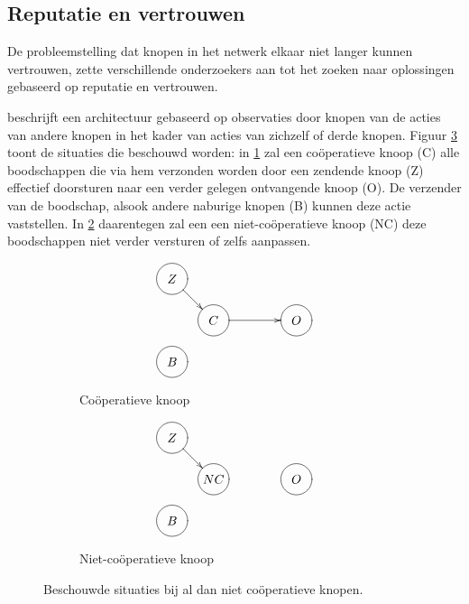 
\subsection{Reputatie en vertrouwen}
\label{subsection:reputation}

De probleemstelling dat knopen in het netwerk elkaar niet langer kunnen
vertrouwen, zette verschillende onderzoekers aan tot het zoeken naar
oplossingen gebaseerd op reputatie en vertrouwen.

\cite{ganeriwal2008reputation} beschrijft een architectuur gebaseerd op
observaties door knopen van de acties van andere knopen in het kader van acties
van zichzelf of derde knopen. Figuur \ref{fig:reputation-cooperation} toont de
situaties die beschouwd worden: in \ref{fig:reputation-cooperative-node} zal
een co\"operatieve knoop (C) alle boodschappen die via hem verzonden worden
door een zendende knoop (Z) effectief doorsturen naar een verder gelegen
ontvangende knoop (O). De verzender van de boodschap, alsook andere naburige
knopen (B) kunnen deze actie vaststellen. In
\ref{fig:reputation-uncooperative-node} daarentegen zal een een
niet-co\"operatieve knoop (NC) deze boodschappen niet verder versturen of zelfs
aanpassen.

\begin{figure}
\centering
\begin{subfigure}{.49\textwidth}
\centering
\[ \entrymodifiers={-=+++[o][F-]}
 \xymatrix@!=0.75pc {
  Z \ar[dr] & *{}       & *{} & *{} \\
  *{}       & C \ar[rr] & *{} & O   \\
  B         & *{}       & *{} & *{} \\
 }
\]
\caption{Co\"operatieve knoop}
\label{fig:reputation-cooperative-node}
\end{subfigure}
\begin{subfigure}{.49\textwidth}
\centering
\[ \entrymodifiers={-=+++[o][F-]}
 \xymatrix@!=0.75pc {
  Z \ar[dr] & *{}       & *{} & *{} \\
  *{}       & NC        & *{} & O   \\
  B         & *{}       & *{} & *{} \\
 }
\]
\caption{Niet-co\"operatieve knoop}
\label{fig:reputation-uncooperative-node}
\end{subfigure}
\caption{Beschouwde situaties bij al dan niet co\"operatieve knopen.}
\label{fig:reputation-cooperation}
\end{figure}

